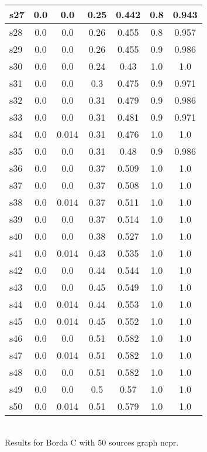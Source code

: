 \documentclass{article}
\begin{document}
\begin{tabular}{|l|c|c|c|c|c|c|}
\hline
s27 &0.0 & 0.0 & 0.25 & 0.442 & 0.8 & 0.943\\
\hline
s28 &0.0 & 0.0 & 0.26 & 0.455 & 0.8 & 0.957\\
\hline
s29 &0.0 & 0.0 & 0.26 & 0.455 & 0.9 & 0.986\\
\hline
s30 &0.0 & 0.0 & 0.24 & 0.43 & 1.0 & 1.0\\
\hline
s31 &0.0 & 0.0 & 0.3 & 0.475 & 0.9 & 0.971\\
\hline
s32 &0.0 & 0.0 & 0.31 & 0.479 & 0.9 & 0.986\\
\hline
s33 &0.0 & 0.0 & 0.31 & 0.481 & 0.9 & 0.971\\
\hline
s34 &0.0 & 0.014 & 0.31 & 0.476 & 1.0 & 1.0\\
\hline
s35 &0.0 & 0.0 & 0.31 & 0.48 & 0.9 & 0.986\\
\hline
s36 &0.0 & 0.0 & 0.37 & 0.509 & 1.0 & 1.0\\
\hline
s37 &0.0 & 0.0 & 0.37 & 0.508 & 1.0 & 1.0\\
\hline
s38 &0.0 & 0.014 & 0.37 & 0.511 & 1.0 & 1.0\\
\hline
s39 &0.0 & 0.0 & 0.37 & 0.514 & 1.0 & 1.0\\
\hline
s40 &0.0 & 0.0 & 0.38 & 0.527 & 1.0 & 1.0\\
\hline
s41 &0.0 & 0.014 & 0.43 & 0.535 & 1.0 & 1.0\\
\hline
s42 &0.0 & 0.0 & 0.44 & 0.544 & 1.0 & 1.0\\
\hline
s43 &0.0 & 0.0 & 0.45 & 0.549 & 1.0 & 1.0\\
\hline
s44 &0.0 & 0.014 & 0.44 & 0.553 & 1.0 & 1.0\\
\hline
s45 &0.0 & 0.014 & 0.45 & 0.552 & 1.0 & 1.0\\
\hline
s46 &0.0 & 0.0 & 0.51 & 0.582 & 1.0 & 1.0\\
\hline
s47 &0.0 & 0.014 & 0.51 & 0.582 & 1.0 & 1.0\\
\hline
s48 &0.0 & 0.0 & 0.51 & 0.582 & 1.0 & 1.0\\
\hline
s49 &0.0 & 0.0 & 0.5 & 0.57 & 1.0 & 1.0\\
\hline
s50 &0.0 & 0.014 & 0.51 & 0.579 & 1.0 & 1.0\\
\hline
\end{tabular}\\

\noindent Results for Borda C with 50 sources graph ncpr.
\end{document}
